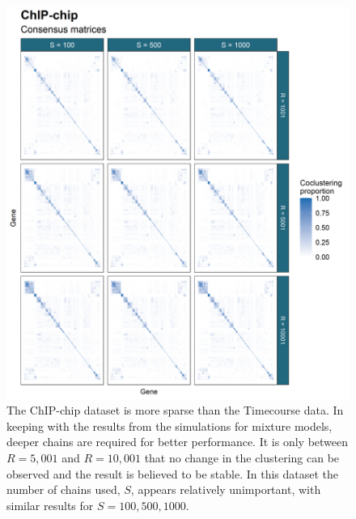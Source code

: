 \documentclass[]{article}
\begin{document}
\begin{figure}
	\centering
	\includegraphics[scale=0.8]{./Images/Yeast/ChIP-chipCMcomparison.png}
	\caption{The ChIP-chip dataset is more sparse than the Timecourse data. In keeping with the results from the simulations for mixture models, deeper chains are required for better performance. It is only between $R=5,001$ and $R=10,001$ that no change in the clustering can be observed and the result is believed to be stable. In this dataset the number of chains used, $S$, appears relatively unimportant, with similar results for $S=100, 500, 1000$.}
	\label{fig:chipchipCMs}
\end{figure}
\end{document}
